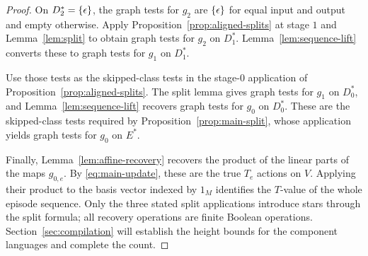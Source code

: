 \begin{proof}
On $D_2^*=\{\epsilon\}$, the graph tests for $g_2$ are $\{\epsilon\}$
for equal input and output and empty otherwise.  Apply
Proposition~\ref{prop:aligned-splits} at stage $1$ and
Lemma~\ref{lem:split} to obtain graph tests for $g_2$ on $D_1^*$.
Lemma~\ref{lem:sequence-lift} converts these to graph tests for
$g_1$ on $D_1^*$.

Use those tests as the skipped-class tests in the stage-$0$
application of Proposition~\ref{prop:aligned-splits}.  The split
lemma gives graph tests for $g_1$ on $D_0^*$, and
Lemma~\ref{lem:sequence-lift} recovers graph tests for $g_0$ on
$D_0^*$.  These are the skipped-class tests required by
Proposition~\ref{prop:main-split}, whose application yields graph
tests for $g_0$ on $E^*$.

Finally, Lemma~\ref{lem:affine-recovery} recovers the product of the
linear parts of the maps $g_{0,e}$.  By \eqref{eq:main-update},
these are the true $T_e$ actions on $V$.  Applying their product to
the basis vector indexed by $1_M$ identifies the $T$-value of the
whole episode sequence.  Only the three stated split applications
introduce stars through the split formula; all recovery operations
are finite Boolean operations.  Section~\ref{sec:compilation}
will establish the height bounds for the component languages and
complete the count.
\end{proof}
